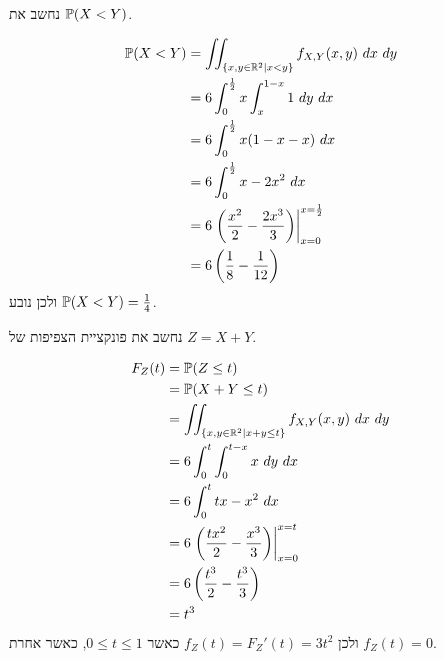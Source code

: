 \subquestion{}
נחשב את $\mathbb{P}(X < Y)$.
\begin{solution}
	\begin{align*}
		\mathbb{P}(X < Y)
		& = \iint_{\{ x, y \in \mathbb{R}^2 \mid x < y \}} f_{X, Y}(x, y)\ dx\ dy \\
		& = 6 \int_0^{\frac{1}{2}} x \int_x^{1 - x} 1\ dy\ dx \\
		& = 6 \int_0^{\frac{1}{2}} x (1 - x - x)\ dx \\
		& = 6 \int_0^{\frac{1}{2}} x - 2x^2\ dx \\
		& = 6 \left. \left( \frac{x^2}{2} - \frac{2x^3}{3} \right) \right\rvert_{x = 0}^{x = \frac{1}{2}} \\
		& = 6 \left( \frac{1}{8} - \frac{1}{12} \right) \\
	\end{align*}
	ולכן נובע $\mathbb{P}(X < Y) = \frac{1}{4}$.
\end{solution}

\subquestion{}
נחשב את פונקציית הצפיפות של $Z = X + Y$.
\begin{solution}
	\begin{align*}
		F_Z(t)
		& = \mathbb{P}(Z \le t) \\
		& = \mathbb{P}(X + Y \le t) \\
		& = \iint_{\{ x, y \in \mathbb{R}^2 \mid x + y \le t \}} f_{X, Y}(x, y)\ dx\ dy \\
		& = 6 \int_0^t \int_0^{t - x} x\ dy\ dx \\
		& = 6 \int_0^t tx - x^2\ dx \\
		& = 6 \left. \left( \frac{tx^2}{2} - \frac{x^3}{3} \right) \right\rvert_{x = 0}^{x = t} \\
		& = 6 \left( \frac{t^3}{2} - \frac{t^3}{3} \right) \\
		& = t^3
	\end{align*}
	ולכן $f_Z(t) = F_Z'(t) = 3t^2$ כאשר $0 \le t \le 1$, כאשר אחרת $f_Z(t) = 0$.
\end{solution}


